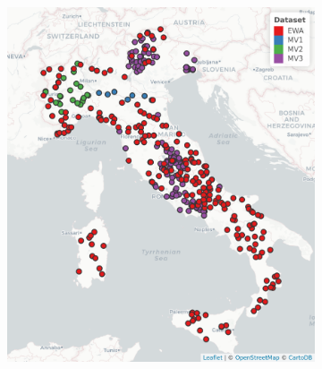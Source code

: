 \begin{figure}
    \centering
    \begin{subfigure}{.475\textwidth}
        \includegraphics[width=\textwidth]{figures/allstats_ita}
    \end{subfigure}
    \begin{subfigure}{.475\textwidth}

\end{subfigure}
\end{figure}
